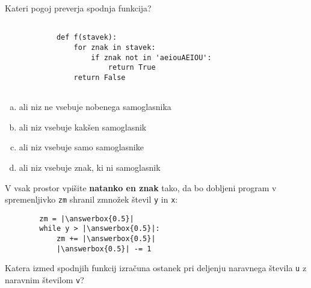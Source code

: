 \documentclass[arhiv, 10pt]{../izpit}
\newcommand{\inlinepy}[1]{\texttt{#1}}
\newcommand{\answerbox}[1]{\framebox{\vphantom{\large M}\hspace{#1cm}}}
\begin{document}
        \naloga*

        \begin{multicols}{2}
        \noindent
        Kateri pogoj preverja spodnja funkcija?
        \begin{verbatim}
        
            def f(stavek):
                for znak in stavek:
                    if znak not in 'aeiouAEIOU':
                        return True
                return False
            
        \end{verbatim}

        \begin{enumerate}[(a)]
\item ali niz ne vsebuje nobenega samoglasnika
\item ali niz vsebuje kakšen samoglasnik
\item ali niz vsebuje samo samoglasnike
\item ali niz vsebuje znak, ki ni samoglasnik
\end{enumerate}

        \end{multicols}
    
        \naloga*
        \begin{multicols}{2}
        \noindent
        V vsak prostor vpišite \textbf{natanko en znak} tako, da bo dobljeni program v spremenljivko \inlinepy{zm} shranil zmnožek števil \inlinepy{y} in \inlinepy{x}:
        
        \columnbreak
        \begin{verbatim}
        zm = |\answerbox{0.5}|
        while y > |\answerbox{0.5}|:
            zm += |\answerbox{0.5}|
            |\answerbox{0.5}| -= 1
        \end{verbatim}
        \end{multicols}
    
        \clearpage
        \naloga
        
        Katera izmed spodnjih funkcij izračuna ostanek pri deljenju naravnega števila \inlinepy{u} z naravnim številom \inlinepy{v}?
    
\end{document}
